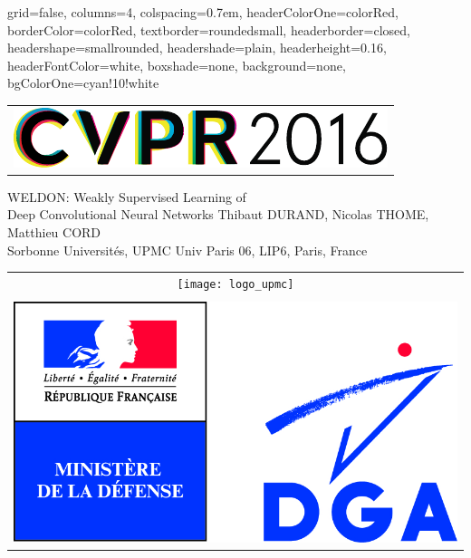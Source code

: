 \documentclass[landscape,a0paper,fontscale=0.292]{baposter}
\begin{document}
\begin{poster}{
 grid=false,
 columns=4,
 colspacing=0.7em,
 headerColorOne=colorRed,
 borderColor=colorRed,
 textborder=roundedsmall,
 headerborder=closed,
 headershape=smallrounded,
 headershade=plain,
 headerheight=0.16\textheight,
 headerFontColor=white,
 boxshade=none,
 background=none,
 bgColorOne=cyan!10!white}
 { 
    \begin{tabular}{c}
      \includegraphics{logo/CVPRLogo} \\
    \end{tabular}
 }
 {\sc\Huge WELDON: Weakly Supervised Learning of \\ \vspace{3mm} Deep Convolutional Neural Networks  \vspace{0.1cm}}
 {Thibaut DURAND, Nicolas THOME, Matthieu CORD \vspace{0.1cm}\\
 {\small Sorbonne Universit\'{e}s, UPMC Univ Paris 06, LIP6, Paris, France}
 } %
 {
    \begin{tabular}{c}
      \texttt{[image: logo\_upmc]}  \\
      \\
      \hspace{-10mm}
      \includegraphics[height=0.075\textheight]{logo/dga.jpg} \hspace{2mm}

\end{tabular}}
\end{poster}
\end{document}
